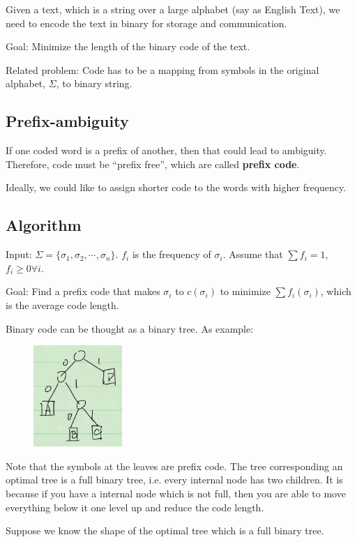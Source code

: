 Given a text, which is a string over a large alphabet (say as English Text), we need to encode the text in binary for storage and communication.

Goal: Minimize the length of the binary code of the text.

Related problem: Code has to be a mapping from symbols in the original alphabet, $\Sigma$, to binary string.

\subsection{Prefix-ambiguity}
If one coded word is a prefix of another, then that could lead to ambiguity. Therefore, code must be ``prefix free'', which are called \textbf{prefix code}.

Ideally, we could like to assign shorter code to the words with higher frequency.
\subsection{Algorithm}
Input: $\Sigma = \{\sigma_1, \sigma_2, \cdots, \sigma_n\}$. $f_i$ is the frequency of $\sigma_i$. Assume that $\sum f_i = 1$, $f_i \ge 0 \forall i$.

Goal: Find a prefix code that makes $\sigma_i$ to $c(\sigma_i)$ to minimize $\sum f_i(\sigma_i)$, which is the average code length.

Binary code can be thought as a binary tree. As example:
\begin{figure}[H]
	\centering
	\includegraphics[width=0.3\textwidth]{binary-code-tree.png}
\end{figure}

Note that the symbols at the leaves are prefix code. The tree corresponding an optimal tree is a full binary tree, i.e. every internal node has two children. It is because if you have a internal node which is not full, then you are able to move everything below it one level up and reduce the code length.

Suppose we know the shape of the optimal tree which is a full binary tree.

